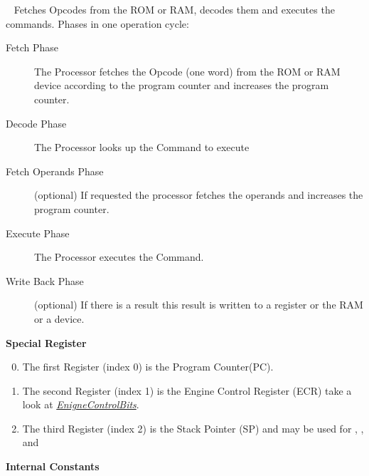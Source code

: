 \documentclass[letterpaper,10pt,english]{sphinxmanual}
\begin{document}

\begin{fulllineitems}
\label{core:py_register_machine2.core.processor.Processor}~\label{core:id2}
Fetches Opcodes from the ROM or RAM, decodes them and executes the commands.
\label{core:processor-phases}
Phases in one operation cycle:
\begin{description}
\item[{Fetch Phase}] \leavevmode
The Processor fetches the Opcode (one word) from the ROM or RAM device
according to the program counter and increases the program counter.

\item[{Decode Phase}] \leavevmode
The Processor looks up the Command to execute

\item[{Fetch Operands Phase}] \leavevmode
(optional) If requested the processor fetches the operands and increases the program counter.

\item[{Execute Phase}] \leavevmode
The Processor executes the Command.

\item[{Write Back Phase}] \leavevmode
(optional) If there is a result this result is written to a register or the RAM or a device.

\end{description}

\textbf{Special Register}
\label{core:pc}\label{core:ecr}\label{core:sp}\begin{enumerate}
\setcounter{enumi}{-1}
\item {} 
The first Register (index 0) is the Program Counter(PC).

\item {} 
The second Register (index 1) is the Engine Control Register (ECR) take a look at {\hyperref[core:enignecontrolbits]{\emph{EnigneControlBits}}}.

\item {} 
The third Register (index 2) is the Stack Pointer (SP) and may be used for , ,  and 

\end{enumerate}
\label{core:internal-constants}
\textbf{Internal Constants}


\end{fulllineitems}
\end{document}
